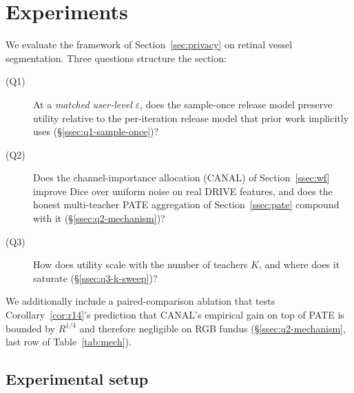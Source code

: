 %
%
%
%

\section{Experiments}
\label{sec:experiments}

We evaluate the framework of Section~\ref{sec:privacy} on retinal vessel
segmentation. Three questions structure the section:

\begin{description}
\item[(Q1)] At a \emph{matched user-level} $\varepsilon$, does the
sample-once release model preserve utility relative to the per-iteration
release model that prior work implicitly uses
(\S\ref{ssec:q1-sample-once})?
\item[(Q2)] Does the channel-importance allocation (CANAL) of
Section~\ref{ssec:wf} improve Dice over uniform noise on real DRIVE
features, and does the honest multi-teacher PATE aggregation of
Section~\ref{ssec:pate} compound with it
(\S\ref{ssec:q2-mechanism})?
\item[(Q3)] How does utility scale with the number of teachers $K$, and
where does it saturate (\S\ref{ssec:q3-k-sweep})?
\end{description}

We additionally include a paired-comparison ablation that tests
Corollary~\ref{cor:r14}'s prediction that CANAL's empirical gain on top
of PATE is bounded by $R^{1/4}$ and therefore negligible on RGB fundus
(\S\ref{ssec:q2-mechanism}, last row of Table~\ref{tab:mech}).

\subsection{Experimental setup}
\label{ssec:setup}

